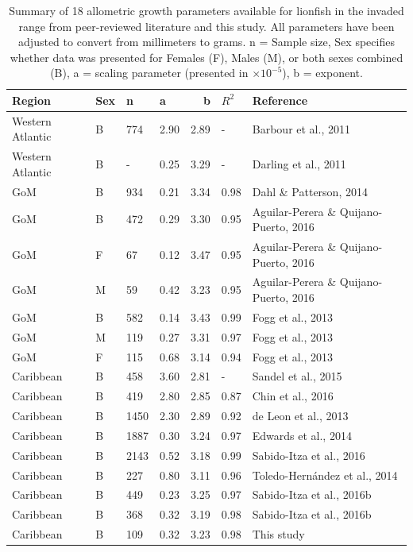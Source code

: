 \documentclass[fleqn,10pt,lineno]{wlpeerj} %
\begin{document}
\begin{table}[t]

\caption{\label{tab:unnamed-chunk-2}\label{tab:all_params}Summary of 18 allometric growth parameters available for lionfish in the invaded range from peer-reviewed literature and this study. All parameters have been adjusted to convert from millimeters to grams. n = Sample size, Sex specifies whether data was presented for Females (F), Males (M), or both sexes combined (B), a = scaling parameter (presented in $\times 10^{-5}$), b = exponent.}
\centering
\begin{tabular}{llllrll}
\toprule
Region & Sex & n & a & b & $R^2$ & Reference\\
\midrule
Western Atlantic & B & 774 & 2.90 & 2.89 & - & Barbour et al., 2011\\
Western Atlantic & B & - & 0.25 & 3.29 & - & Darling et al., 2011\\
GoM & B & 934 & 0.21 & 3.34 & 0.98 & Dahl \& Patterson, 2014\\
GoM & B & 472 & 0.29 & 3.30 & 0.95 & Aguilar-Perera \& Quijano-Puerto, 2016\\
GoM & F & 67 & 0.12 & 3.47 & 0.95 & Aguilar-Perera \& Quijano-Puerto, 2016\\
\addlinespace
GoM & M & 59 & 0.42 & 3.23 & 0.95 & Aguilar-Perera \& Quijano-Puerto, 2016\\
GoM & B & 582 & 0.14 & 3.43 & 0.99 & Fogg et al., 2013\\
GoM & M & 119 & 0.27 & 3.31 & 0.97 & Fogg et al., 2013\\
GoM & F & 115 & 0.68 & 3.14 & 0.94 & Fogg et al., 2013\\
Caribbean & B & 458 & 3.60 & 2.81 & - & Sandel et al., 2015\\
\addlinespace
Caribbean & B & 419 & 2.80 & 2.85 & 0.87 & Chin et al., 2016\\
Caribbean & B & 1450 & 2.30 & 2.89 & 0.92 & de Leon et al., 2013\\
Caribbean & B & 1887 & 0.30 & 3.24 & 0.97 & Edwards et al., 2014\\
Caribbean & B & 2143 & 0.52 & 3.18 & 0.99 & Sabido-Itza et al., 2016\\
Caribbean & B & 227 & 0.80 & 3.11 & 0.96 & Toledo-Hernández et al., 2014\\
\addlinespace
Caribbean & B & 449 & 0.23 & 3.25 & 0.97 & Sabido-Itza et al., 2016b\\
Caribbean & B & 368 & 0.32 & 3.19 & 0.98 & Sabido-Itza et al., 2016b\\
Caribbean & B & 109 & 0.32 & 3.23 & 0.98 & This study\\
\bottomrule
\end{tabular}
\end{table}
\end{document}
